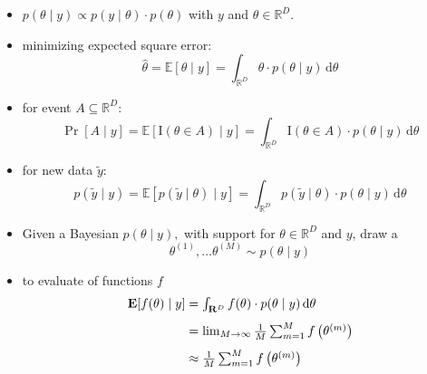 \documentclass[10pt]{report}
\newcommand{\expect}[1]{\mathbb{E}\!\left[ #1 \right]}
\newcommand{\draw}[2]{#1^{(#2)}}
\begin{document}
\begin{itemize}
\item {} $p(\theta \mid y) \propto p(y \mid \theta) \cdot
  p(\theta)$ with  $y$ and  $\theta \in \mathbb{R}^D$.
\item {} minimizing expected square error:
  $$ \textstyle
  \widehat{\theta}
  = \expect{\theta \mid y}
  = \int_{\mathbb{R}^D}
  \theta \cdot p(\theta \mid y)
  \, \textrm{d}\theta 
  $$
\item {} for event $A \subseteq \mathbb{R}^D$:
  $$ \textstyle
  \Pr[A \mid y]
  = \expect{\textrm{I}(\theta \in A) \mid y}
  = \int_{\mathbb{R}^D}
  \textrm{I}(\theta \in A) \cdot p(\theta \mid y) 
  \, \textrm{d}\theta 
  $$
\item {} for new data $\widetilde{y}$:
  $$ \textstyle
  p(\widetilde{y} \mid y) 
  = \expect{p(\widetilde{y} \mid \theta) \mid y}
  = \int_{\mathbb{R}^D}
  p(\widetilde{y} \mid \theta) \cdot p(\theta \mid y) 
  \, \textrm{d}\theta 
  $$
\end{itemize}


\begin{itemize}
\item Given a Bayesian  $p(\theta \mid y),$
  with support for  $\theta \in \mathbb{R}^D$ and  $y$,
  draw a 
  $$ \textstyle
  \draw{\theta}{1}, \ldots \draw{\theta}{M} \sim p(\theta \mid y)
  $$
\item to evaluate  of functions $f$
\begin{align*}
  \textstyle 
  \expect{f(\theta) \mid y}
  &= \textstyle \int_{\mathbb{R}^D} f(\theta) \cdot p(\theta \mid y) \,
    \textrm{d}\theta
  \\[4pt]
  &= \textstyle \lim_{M \rightarrow \infty} \frac{1}{M} \sum_{m=1}^M 
f\left( \draw{\theta}{m} \right)
  \\[4pt] \textstyle
  &\approx \textstyle \frac{1}{M} \sum_{m=1}^M f\left(\draw{\theta}{m}\right) 
\end{align*}
\end{itemize}
\end{document}
